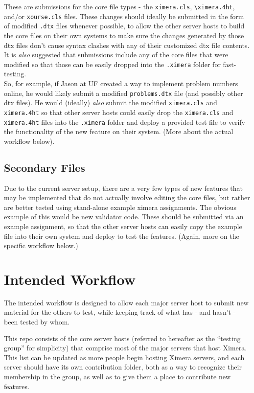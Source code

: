 \documentclass{ximera}
\begin{document}
        These are submissions for the core file types - the \verb|ximera.cls|, \verb|\ximera.4ht|, and/or \verb|xourse.cls| files. These changes should ideally be submitted in the form of modified \verb|.dtx| files whenever possible, to allow the other server hosts to build the core files on their own systems to make sure the changes generated by those dtx files don't cause syntax clashes with any of their customized dtx file contents. \\
        It is \textit{also} suggested that submissions include any of the core files that were modified so that those can be easily dropped into the \verb|.ximera| folder for fast-testing.\\
        So, for example, if Jason at UF created a way to implement problem numbers online, he would likely submit a modified \verb|problems.dtx| file (and possibly other dtx files). He would (ideally) \textit{also} submit the modified \verb|ximera.cls| and \verb|ximera.4ht| so that other server hosts could easily drop the \verb|ximera.cls| and \verb|ximera.4ht| files into the \verb|.ximera| folder and deploy a provided test file to verify the functionality of the new feature on their system. (More about the actual workflow below).
    
    \subsection{Secondary Files}
        
        Due to the current server setup, there are a very few types of new features that may be implemented that do not actually involve editing the core files, but rather are better tested using stand-alone example ximera assignments. The obvious example of this would be new validator code. These should be submitted via an example assignment, so that the other server hosts can easily copy the example file into their own system and deploy to test the features. (Again, more on the specific workflow below.)


\section{Intended Workflow}
    
    The intended workflow is designed to allow each major server host to submit new material for the others to test, while keeping track of what has - and hasn't - been tested by whom. 
    
    This repo consists of the core server hosts (referred to hereafter as the ``testing group'' for simplicity) that comprise most of the major servers that host Ximera. This list can be updated as more people begin hosting Ximera servers, and each server should have its own contribution folder, both as a way to recognize their membership in the group, as well as to give them a place to contribute new features.
\end{document}
